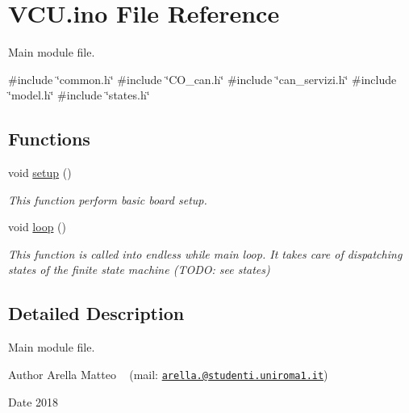 \hypertarget{_v_c_u_8ino}{}\section{V\+C\+U.\+ino File Reference}
\label{_v_c_u_8ino}


Main module file.  


{\ttfamily \#include \char`\"{}common.\+h\char`\"{}}\newline
{\ttfamily \#include \char`\"{}C\+O\+\_\+can.\+h\char`\"{}}\newline
{\ttfamily \#include \char`\"{}can\+\_\+servizi.\+h\char`\"{}}\newline
{\ttfamily \#include \char`\"{}model.\+h\char`\"{}}\newline
{\ttfamily \#include \char`\"{}states.\+h\char`\"{}}\newline
\subsection*{Functions}
\begin{DoxyCompactItemize}
\item 
void \mbox{\hyperlink{_v_c_u_8ino_a4fc01d736fe50cf5b977f755b675f11d}{setup}} ()
\begin{DoxyCompactList}\small\item\em This function perform basic board setup. \end{DoxyCompactList}\item 
void \mbox{\hyperlink{_v_c_u_8ino_afe461d27b9c48d5921c00d521181f12f}{loop}} ()
\begin{DoxyCompactList}\small\item\em This function is called into endless while main loop. It takes care of dispatching states of the finite state machine (T\+O\+DO\+: see states) \end{DoxyCompactList}\end{DoxyCompactItemize}


\subsection{Detailed Description}
Main module file. 

\begin{DoxyAuthor}{Author}
Arella Matteo ~\newline
 (mail\+: \href{mailto:arella.1646983@studenti.uniroma1.it}{\tt arella.@studenti.\+uniroma1.\+it}) 
\end{DoxyAuthor}
\begin{DoxyDate}{Date}
2018 
\end{DoxyDate}


